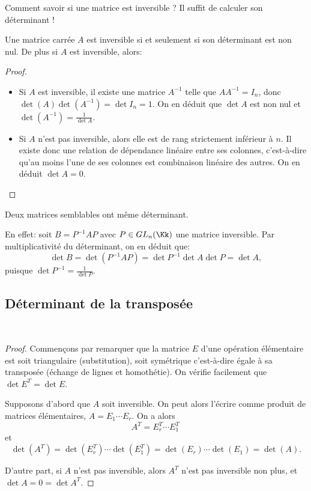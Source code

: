 \documentclass[class=report,crop=false]{standalone}
\begin{document}
Comment savoir si une matrice est inversible ? Il suffit de calculer son déterminant !

\begin{corollaire}
Une matrice carrée $A$ est inversible si et seulement si son
déterminant est non nul. De plus si $A$ est inversible,
alors:
\end{corollaire}

\begin{proof}
~
\begin{itemize}
  \item Si $A$ est inversible, il existe une matrice $A^{-1}$ telle que
 $AA^{-1}=I_n$, donc $\det (A)\det (A^{-1})=\det I_n=1$. On en
 déduit que $\det A$ est non nul et $\det (A^{-1})=\frac1{\det A}$.

  \item Si $A$ n'est pas inversible, alors elle est de rang strictement
inférieur à $n$. Il existe donc une relation de dépendance
linéaire entre ses colonnes, c'est-à-dire qu'au moins l'une de ses
colonnes est combinaison linéaire des autres. On en déduit $\det A = 0$.
\end{itemize}




\end{proof}


\begin{exemple}
Deux  matrices semblables ont même déterminant.

En effet: soit $B=P^{-1}AP$ avec $P\in GL_n(\Kk)$ une matrice inversible.
Par multiplicativité du déterminant,
on en déduit que:
$$\det B=\det (P^{-1}AP)=\det P^{-1}\det A\det P=\det A,$$
puisque $\det P^{-1}=\frac{1}{\det P}$.
\end{exemple}


\subsection{Déterminant de la transposée}

\begin{corollaire}~
\end{corollaire}

\begin{proof}
Commençons par remarquer que la matrice $E$ d'une opération élémentaire est
soit triangulaire (substitution), soit symétrique c'est-à-dire égale
à sa transposée (échange de lignes et homothétie).
On vérifie facilement que $\det E^T =\det E$.


Supposons d'abord que $A$ soit inversible. On peut alors l'écrire
comme produit de matrices élémentaires, $A=E_1 \cdots E_r$.
On a alors
$$A^T = E_r^T \cdots E_1^T\,$$
et
$$\det(A^T)= \det(E_r^T)\cdots \det(E_1^T) = \det(E_r)\cdots \det (E_1)= \det (A).$$

D'autre part, si $A$ n'est pas inversible, alors $A^T$ n'est pas
  inversible non plus, et $\det A = 0 = \det A^T$.


\end{proof}
\end{document}

